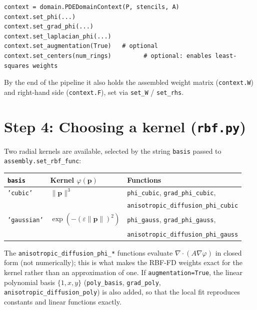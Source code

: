 \documentclass[11pt]{article}
\newcommand{\diver}{\nabla\!\cdot}
\newcommand{\grad}{\nabla}
\newcommand{\bp}{\mathbf{p}}
\begin{document}
\begin{lstlisting}
context = domain.PDEDomainContext(P, stencils, A)
context.set_phi(...)
context.set_grad_phi(...)
context.set_laplacian_phi(...)
context.set_augmentation(True)   # optional
context.set_centers(num_rings)         # optional: enables least-squares weights
\end{lstlisting}

By the end of the pipeline it also holds the assembled weight matrix
(\texttt{context.W}) and right-hand side (\texttt{context.F}), set via
\texttt{set\_W} / \texttt{set\_rhs}.

\section{Step 4: Choosing a kernel (\texttt{rbf.py})}

Two radial kernels are available, selected by the string
\texttt{basis} passed to \texttt{assembly.set\_rbf\_func}:

\begin{center}
\begin{tabular}{@{}lll@{}}
\toprule
\textbf{\texttt{basis}} & \textbf{Kernel $\varphi(\bp)$} & \textbf{Functions} \\
\midrule
\texttt{'cubic'} & $\|\bp\|^3$ & \texttt{phi\_cubic}, \texttt{grad\_phi\_cubic}, \\
                  & & \texttt{anisotropic\_diffusion\_phi\_cubic} \\
\texttt{'gaussian'} & $\exp(-(\varepsilon\|\bp\|)^2)$ & \texttt{phi\_gauss}, \texttt{grad\_phi\_gauss}, \\
                     & & \texttt{anisotropic\_diffusion\_phi\_gauss} \\
\bottomrule
\end{tabular}
\end{center}

The \texttt{anisotropic\_diffusion\_phi\_*} functions evaluate
$\diver(A\grad\varphi)$ in closed form (not numerically); this is what
makes the RBF-FD weights exact for the kernel rather than an
approximation of one. If \texttt{augmentation=True}, the linear
polynomial basis $\{1,x,y\}$ (\texttt{poly\_basis}, \texttt{grad\_poly},
\texttt{anisotropic\_diffusion\_poly}) is also added, so that the
local fit reproduces constants and linear functions exactly.

\end{document}
